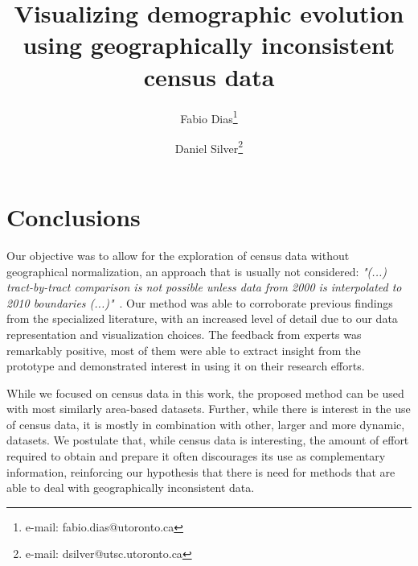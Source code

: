 \documentclass[review]{vgtc}                 %
\title{Visualizing demographic evolution using geographically inconsistent census data}
\author{Fabio Dias\thanks{e-mail: fabio.dias@utoronto.ca} %
\and Daniel Silver\thanks{e-mail: dsilver@utsc.utoronto.ca}}
\affiliation{\scriptsize University of Toronto}
\begin{document}

\maketitle












\section{Conclusions}
Our objective was to allow for the exploration of census data without
geographical normalization, an approach that is usually not considered:
\emph{"(...) tract-by-tract comparison is not possible unless data from 2000 is
interpolated to 2010 boundaries (...)"}~\cite{Dmowska2017}. Our method was able
to corroborate previous findings from the specialized literature, with an
increased level of detail due to our data representation and visualization
choices. The feedback from experts was remarkably positive, most of them were
able to extract insight from the prototype and demonstrated interest in using it
on their research efforts.

While we focused on census data in this work, the proposed method can be used
with most similarly area-based datasets. Further, while there is interest in the
use of census data, it is mostly in combination with other, larger and more
dynamic, datasets. We postulate that, while census data is interesting, the
amount of effort required to obtain and prepare it often discourages its use as
complementary information, reinforcing our hypothesis that there is need for
methods that are able to deal with geographically inconsistent data. 






\end{document}

